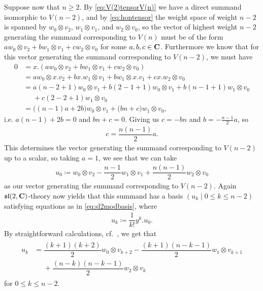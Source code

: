Suppose now that $n\geq 2$. By \cref{eq:V(2)tensorV(n)} we have a direct summand isomorphic to $V(n-2)$, and by \cref{eq:hontensor} the weight space of weight $n-2$ is spanned by $w_0\otimes v_2$, $w_1\otimes v_1$, and $w_2\otimes v_0$, so the vector of highest weight $n-2$ generating the summand corresponding to $V(n)$ must be of the form $aw_0\otimes v_2 + bw_1\otimes v_1 + cw_2\otimes v_0$ for some $a,b,c\in\mathbf{C}$. Furthermore we know that for this vector generating the summand corresponding to $V(n-2)$, we must have
\begin{align*}
  0 &= x.(aw_0\otimes v_2 + bw_1\otimes v_1 + cw_2\otimes v_0) \\
    &= aw_0\otimes x.v_2 + bx.w_1\otimes v_1 + bw_1\otimes x.v_1 + cx.w_2\otimes v_0 \\
    &= a(n-2+1)w_0\otimes v_1 + b(2-1+1)w_0\otimes v_1 + b(n-1+1)w_1\otimes v_0 \\
  &\phantom{{}={}}{} + c(2-2+1)w_1\otimes v_0 \\
    &= \bigl((n-1)a + 2b\bigr)w_0\otimes v_1 + \bigl(bn + c\bigr)w_1\otimes v_0,
\end{align*}
i.e. $a(n-1)+2b=0$ and $bn+c=0$. Giving us $c=-bn$ and $b=-\tfrac{n-1}{2}a$, so
\begin{align*}
  c=\dfrac{n(n-1)}{2}a.
\end{align*}
This determines the vector generating the summand corresponding to $V(n-2)$ up to a scalar, so taking $a=1$, we see that we can take
\begin{align*}
  u_0 \coloneqq w_0\otimes v_2 - \dfrac{n-1}{2}w_1\otimes v_1 + \dfrac{n(n-1)}{2}w_2\otimes v_0
\end{align*}
as our vector generating the summand corresponding to $V(n-2)$. Again $\mathfrak{sl}(2,\mathbf{C})$-theory now yields that this summand has a basis $(u_k \mid 0\leq k\leq n-2)$ satisfying equations as in \cref{eq:sl2modbasis}, where 
\begin{align}\label{eq:u_kbasisdef}
  u_k \coloneqq \dfrac{1}{k!}y^k.u_0.
\end{align}
By straightforward calculations, cf.\ , we get that
\begin{align}\label{eq:u_kbasisres}
  \begin{aligned}
    u_k &= \dfrac{(k+1)(k+2)}{2}w_0\otimes v_{k+2} - \dfrac{(k+1)(n-k-1)}{2}w_1\otimes v_{k+1} \\
    &\phantom{{}={}}{} + \dfrac{(n-k)(n-k-1)}{2}w_2\otimes v_k
  \end{aligned}
\end{align}
for $0\leq k\leq n-2$. 

